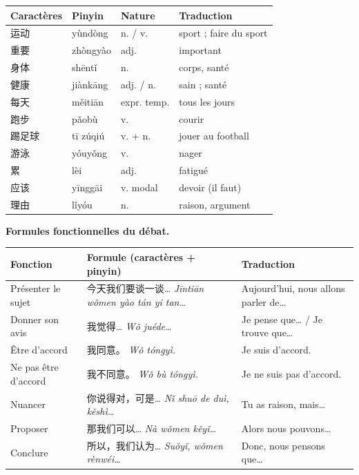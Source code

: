 \documentclass[11pt]{article}
\begin{document}
\begin{center}
\begin{tabularx}{\linewidth}{|X|X|X|X|}
\hline
\rowcolor{popblueL} Caractères & Pinyin & Nature & Traduction \\
\hline
运动 & yùndòng & n. / v. & sport ; faire du sport \\
\hline
重要 & zhòngyào & adj. & important \\
\hline
身体 & shēntǐ & n. & corps, santé \\
\hline
健康 & jiànkāng & adj. / n. & sain ; santé \\
\hline
每天 & měitiān & expr. temp. & tous les jours \\
\hline
跑步 & pǎobù & v. & courir \\
\hline
踢足球 & tī zúqiú & v. + n. & jouer au football \\
\hline
游泳 & yóuyǒng & v. & nager \\
\hline
累 & lèi & adj. & fatigué \\
\hline
应该 & yīnggāi & v. modal & devoir (il faut) \\
\hline
理由 & lǐyóu & n. & raison, argument \\
\hline
\end{tabularx}
\end{center}

\textbf{Formules fonctionnelles du débat.}

\begin{center}
\begin{tabularx}{\linewidth}{|X|X|X|}
\hline
\rowcolor{popblueL} Fonction & Formule (caractères + pinyin) & Traduction \\
\hline
Présenter le sujet & 今天我们要谈一谈… \emph{Jīntiān wǒmen yào tán yi tan…} & Aujourd'hui, nous allons parler de… \\
\hline
Donner son avis & 我觉得… \emph{Wǒ juéde…} & Je pense que… / Je trouve que… \\
\hline
Être d'accord & 我同意。 \emph{Wǒ tóngyì.} & Je suis d'accord. \\
\hline
Ne pas être d'accord & 我不同意。 \emph{Wǒ bù tóngyì.} & Je ne suis pas d'accord. \\
\hline
Nuancer & 你说得对，可是… \emph{Nǐ shuō de duì, kěshì…} & Tu as raison, mais… \\
\hline
Proposer & 那我们可以… \emph{Nà wǒmen kěyǐ…} & Alors nous pouvons… \\
\hline
Conclure & 所以，我们认为… \emph{Suǒyǐ, wǒmen rènwéi…} & Donc, nous pensons que… \\
\hline
\end{tabularx}
\end{center}
\end{document}
